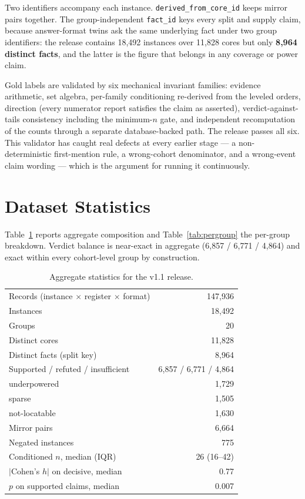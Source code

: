 Two identifiers accompany each instance. \texttt{derived\_from\_core\_id} keeps
mirror pairs together. The group-independent \texttt{fact\_id} keys every split
and supply claim, because answer-format twins ask the same underlying fact under
two group identifiers: the release contains 18{,}492 instances over 11{,}828
cores but only \textbf{8{,}964 distinct facts}, and the latter is the figure that
belongs in any coverage or power claim.

Gold labels are validated by six mechanical invariant families: evidence
arithmetic, set algebra, per-family conditioning re-derived from the leveled
orders, direction (every numerator report satisfies the claim as asserted),
verdict-against-tails consistency including the minimum-$n$ gate, and independent
recomputation of the counts through a separate database-backed path. The release
passes all six. This validator has caught real defects at every earlier stage --- a
non-deterministic first-mention rule, a wrong-cohort denominator, and a
wrong-event claim wording --- which is the argument for running it continuously.

\section{Dataset Statistics}
\label{sec:stats}

Table~\ref{tab:totals} reports aggregate composition and
Table~\ref{tab:pergroup} the per-group breakdown. Verdict balance is near-exact
in aggregate (6{,}857 / 6{,}771 / 4{,}864) and exact within every cohort-level
group by construction.

\begin{table}[t]
\centering
\small
\begin{tabular}{lr}
\toprule
Records (instance $\times$ register $\times$ format) & 147{,}936 \\
Instances & 18{,}492 \\
Groups & 20 \\
Distinct cores & 11{,}828 \\
Distinct facts (split key) & 8{,}964 \\
\midrule
Supported / refuted / insufficient & 6{,}857 / 6{,}771 / 4{,}864 \\
\quad underpowered & 1{,}729 \\
\quad sparse & 1{,}505 \\
\quad not-locatable & 1{,}630 \\
\midrule
Mirror pairs & 6{,}664 \\
Negated instances & 775 \\
\midrule
Conditioned $n$, median (IQR) & 26 (16--42) \\
$|$Cohen's $h|$ on decisive, median & 0.77 \\
$p$ on supported claims, median & 0.007 \\
\bottomrule
\end{tabular}
\caption{Aggregate statistics for the v1.1 release.}
\label{tab:totals}
\end{table}

